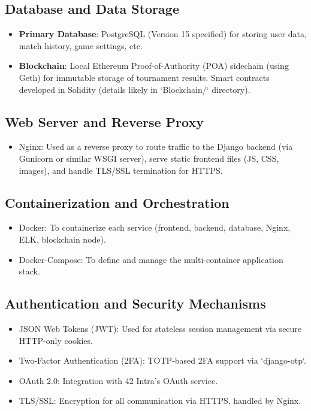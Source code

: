 \subsection*{Database and Data Storage}
\begin{itemize}
    \item \textbf{Primary Database}: PostgreSQL (Version 15 specified) for storing user data, match history, game settings, etc.
    \item \textbf{Blockchain}: Local Ethereum Proof-of-Authority (POA) sidechain (using Geth) for immutable storage of tournament results. Smart contracts developed in Solidity (details likely in `Blockchain/` directory).
\end{itemize}

\subsection*{Web Server and Reverse Proxy}
\begin{itemize}
    \item Nginx: Used as a reverse proxy to route traffic to the Django backend (via Gunicorn or similar WSGI server), serve static frontend files (JS, CSS, images), and handle TLS/SSL termination for HTTPS.
\end{itemize}

\subsection*{Containerization and Orchestration}
\begin{itemize}
    \item Docker: To containerize each service (frontend, backend, database, Nginx, ELK, blockchain node).
    \item Docker-Compose: To define and manage the multi-container application stack.
\end{itemize}

\subsection*{Authentication and Security Mechanisms}
\begin{itemize}
    \item JSON Web Tokens (JWT): Used for stateless session management via secure HTTP-only cookies.
    \item Two-Factor Authentication (2FA): TOTP-based 2FA support via `django-otp`.
    \item OAuth 2.0: Integration with 42 Intra's OAuth service.
    \item TLS/SSL: Encryption for all communication via HTTPS, handled by Nginx.
\end{itemize}

